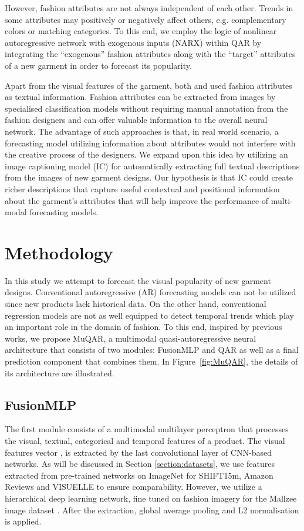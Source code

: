 \documentclass{article}
\begin{document}
However, fashion attributes are not always independent of each other. Trends in some attributes may positively or negatively affect others, e.g. complementary colors or matching categories. 
To this end, we employ the logic of nonlinear autoregressive network with exogenous inputs (NARX) \cite{billings2013nonlinear} within QAR by integrating the ``exogenous'' fashion attributes along with the ``target'' attributes of a new garment in order to forecast its popularity.

Apart from the visual features of the garment,
both \cite{ekambaram2020attention} and \cite{skenderi2021well} used fashion attributes as textual information. 
Fashion attributes can be extracted from images by specialised classification models without requiring manual annotation from the fashion designers and can offer valuable information to the overall neural network. 
The advantage of such approaches is that, in real world scenario, a forecasting model utilizing information about attributes would not interfere with the creative process of the designers.
We expand upon this idea by utilizing an image captioning model (IC) for automatically extracting full textual descriptions from the images of new garment designs. Our hypothesis is that IC could create richer descriptions that capture useful contextual and positional information about the garment's attributes that will help improve the performance of multi-modal forecasting models.

\section{Methodology}
\label{section:MuQAR}

In this study we attempt to forecast the visual popularity of new garment designs. Conventional autoregressive (AR) forecasting models can not be utilized since new products lack historical data. On the other hand, conventional regression models are not as well equipped to detect temporal trends which play an important role in the domain of fashion. 
To this end, inspired by previous works, we propose MuQAR, a multimodal quasi-autoregressive neural architecture that consists of two modules: FusionMLP and QAR as well as a final prediction component that combines them. In Figure~\ref{fig:MuQAR}, the details of its architecture are illustrated.

\subsection{FusionMLP}
The first module consists of a multimodal multilayer perceptron that processes the visual, textual, categorical and temporal features of a product. The visual features vector , is extracted by the last convolutional layer of CNN-based networks. 
As will be discussed in Section \ref{section:datasets}, we use features extracted from pre-trained networks on ImageNet for SHIFT15m, Amazon Reviews and VISUELLE to ensure comparability. However, we utilize a hierarchical deep learning network, fine tuned on fashion imagery for the Mallzee image dataset \cite{papadopoulos2022attentive}.
After the extraction, global average pooling and L2 normalisation is applied. 
\end{document}

